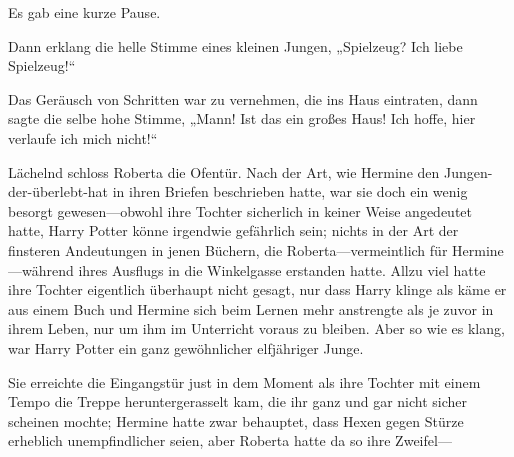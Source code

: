 Es gab eine kurze Pause.

Dann erklang die helle Stimme eines kleinen Jungen, „Spielzeug? Ich liebe Spielzeug!“

Das Geräusch von Schritten war zu vernehmen, die ins Haus eintraten, dann sagte die selbe hohe Stimme, „Mann! Ist das ein großes Haus! Ich hoffe, hier verlaufe ich mich nicht!“

Lächelnd schloss Roberta die Ofentür. Nach der Art, wie Hermine den Jungen-der-überlebt-hat in ihren Briefen beschrieben hatte, war sie doch ein wenig besorgt gewesen—obwohl ihre Tochter sicherlich in keiner Weise angedeutet hatte, Harry Potter könne irgendwie gefährlich sein; nichts in der Art der finsteren Andeutungen in jenen Büchern, die Roberta—vermeintlich für Hermine—während ihres Ausflugs in die Winkelgasse erstanden hatte. Allzu viel hatte ihre Tochter eigentlich überhaupt nicht gesagt, nur dass Harry klinge als käme er aus einem Buch und Hermine sich beim Lernen mehr anstrengte als je zuvor in ihrem Leben, nur um ihm im Unterricht voraus zu bleiben. Aber so wie es klang, war Harry Potter ein ganz gewöhnlicher elfjähriger Junge.

Sie erreichte die Eingangstür just in dem Moment als ihre Tochter mit einem Tempo die Treppe heruntergerasselt kam, die ihr ganz und gar nicht sicher scheinen mochte; Hermine hatte zwar behauptet, dass Hexen gegen Stürze erheblich unempfindlicher seien, aber Roberta hatte da so ihre Zweifel—

